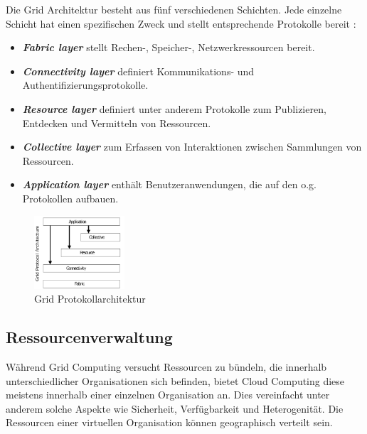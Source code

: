 Die Grid Architektur besteht aus fünf verschiedenen Schichten. Jede einzelne Schicht hat einen spezifischen Zweck und stellt entsprechende Protokolle bereit \cite{360-degree-compared}:

\begin{itemize}
\item \textbf{\textit{Fabric layer}} stellt Rechen-, Speicher-, Netzwerkressourcen bereit.
\item \textbf{\textit{Connectivity layer}} definiert Kommunikations- und Authentifizierungsprotokolle.
\item \textbf{\textit{Resource layer}} definiert unter anderem Protokolle zum Publizieren, Entdecken und Vermitteln von Ressourcen.
\item \textbf{\textit{Collective layer}} zum Erfassen von Interaktionen zwischen Sammlungen von Ressourcen.
\item \textbf{\textit{Application layer}} enthält Benutzeranwendungen, die auf den o.g. Protokollen aufbauen.
\end{itemize}





\begin{figure}[ht]
	\centering
  \includegraphics[width=0.3\textwidth]{Images/grid-protocol-arch.jpg}
	\caption{Grid Protokollarchitektur\cite{360-degree-compared}}
	\label{gpa}
\end{figure}


\subsection{Ressourcenverwaltung}
Während Grid Computing versucht Ressourcen zu bündeln, die innerhalb unterschiedlicher Organisationen sich befinden, bietet Cloud Computing diese meistens innerhalb einer einzelnen Organisation an. Dies vereinfacht unter anderem solche Aspekte wie Sicherheit, Verfügbarkeit und Heterogenität\cite{comp-cloud-grid-cluster-virt}.
Die Ressourcen einer virtuellen Organisation können geographisch verteilt sein.

